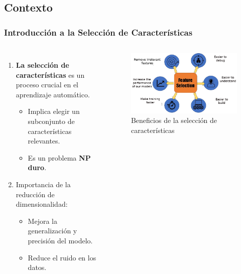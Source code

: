 \subsection{Contexto}
\begin{frame}
  \frametitle{Introducción a la Selección de Características}
  \begin{columns}
    \begin{enumerate}
      \item \textbf{La selección de características} es un proceso crucial en el aprendizaje automático.
            \begin{itemize}
              \item Implica elegir un subconjunto de características relevantes.
              \item Es un problema \textbf{NP duro}.
            \end{itemize}
            \item{Importancia de la reducción de dimensionalidad}:
            \begin{itemize}
              \item Mejora la generalización y precisión del modelo.
              \item Reduce el ruido en los datos.
            \end{itemize}
    \end{enumerate}
    \begin{figure}
      \begin{center}
        \includegraphics[width=\textwidth]{imagenes/chapter1/feature_selection_pros-removebg-preview.png}
      \end{center}
      \caption{Beneficios de la selección de características}
    \end{figure}
  \end{columns}
  \vspace{-.2cm}
\end{frame}

